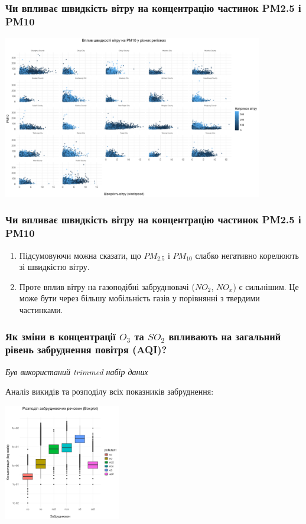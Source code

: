 \documentclass{beamer}
\begin{document}
\begin{frame}
  \frametitle{Чи впливає швидкість вітру на концентрацію частинок PM2.5 і PM10}

  \begin{center}
    \includegraphics[height=2.8in]{plots/question1/scatter_pm10_region.png}

  \end{center}
\end{frame}

\begin{frame}
  \frametitle{Чи впливає швидкість вітру на концентрацію частинок PM2.5 і PM10}

  \begin{enumerate}
    \item Підсумовуючи можна сказати, що $PM_{2.5}$ і $ PM_{10}$ слабко негативно корелюють зі швидкістю вітру.
    \item Проте вплив вітру на газоподібні забруднювачі ($NO_2$, $NO_x$) є сильнішим. 
    Це може бути через більшу мобільність газів у порівнянні з твердими частинками.
  \end{enumerate}

\end{frame}


\begin{frame}
  \frametitle{Як зміни в концентрації $O_3$ та $SO_2$ впливають на загальний рівень забруднення повітря (AQI)?}

  \textit{Був використаний trimmed набір даних}

  Аналіз викидів та розподілу всіх показників забруднення:

  \begin{center}
    \includegraphics[height=2in]{plots/question2/boxplot_pollutants.png}
  \end{center}
\end{frame}
\end{document}
